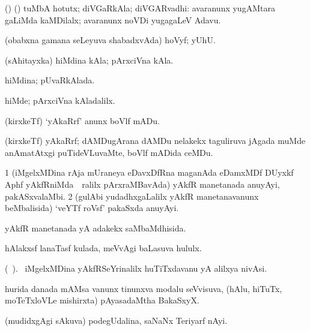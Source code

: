 \bentry
{} 
\gl{\nA} 
\bmng
(\bava) (\ashi) tuMbA hotutx; 
diVGaRkAla; diVGARvadhi:  avaranunx yugAMtara  gaLiMda kaMDilalx; avaranunx noVDi yugagaLeV Adavu.
\emng
\eentry

\bentry
{} 
\gl{\BAavayx} 
\bmng
(obabxna gamana seLeyuva shabadxvAda) hoVyf; yUhU.
\emng
\eentry

\bentry
{} 
\gl{\nA} 
\bmng
(sAhitayxka) hiMdina kAla; pArxciVna kAla.
\emng

\noindent
\gl{\pagu} 
\bmng
{}  
\banum
{} hiMdina; pUvaRkAlada. 

  hiMde; pArxciVna kAladalilx.
\eanum
\emng
\eentry


\bentry
{} 
\gl{\sakirx} 
\bmng
(kirxkeTf) `yAkaRrf' anunx boVlf mADu.
\emng
\eentry

\bentry
{} 
\gl{\nA} 
\bmng
(kirxkeTf) yAkaRrf;  dAMDugArana dAMDu nelakekx taguliruva jAgada muMde anAmatAtxgi puTideVLuvaMte, boVlf mADida ceMDu.
\emng
\eentry

\bentry
{} 
\gl{\nA} 
\bmng
\bnum
\num{1} (iMgelxMDina rAja mUraneya eDavxDfRna maganAda eDamxMDf DUyxkf Aphf yAkfRniMda \kirxsha\, \,ralilx  pArxraMBavAda) yAkfR manetanada anuyAyi, pakASxvalaMbi. 
\num{2} (gulAbi yudadhxgaLalilx yAkfR manetanavanunx beMbalisida) `veYTf roVsf' pakaSxda anuyAyi.
\enum
\emng
\eentry

\bentry
{} 
\gl{\gu} 
\bmng
yAkfR manetanada yA adakekx saMbaMdhisida.
\emng
\eentry

\bentry
{}
\gl{\saMkiSx}  
\bmng
{}
\emng
\eentry

\bentry
{}  
\gl{\nA} 
\bmng
hAlakxsf lanaTasf kulada, meVvAgi baLasuva hululx.
\emng
\eentry

\bentry
{} 
\gl{\nA} 
\bmng
(\bava\ ). 
\kanu\ iMgelxMDina yAkfRSeYrinalilx huTiTxdavanu yA alilxya nivAsi.
\emng
\eentry

\bentry
{}
\gl{\nA} 
\bmng
hurida danada mAMsa \mo vanunx tinunxva modalu seVvisuva, (hAlu, hiTuTx, moTeTxloVLe  mishirxta) pAyasadaMtha BakaSxyX.
\emng
\eentry

\bentry
{}
\gl{\nA} 
\bmng
(mudidxgAgi sAkuva) podegUdalina, saNaNx Teriyarf nAyi.
\emng
\eentry


